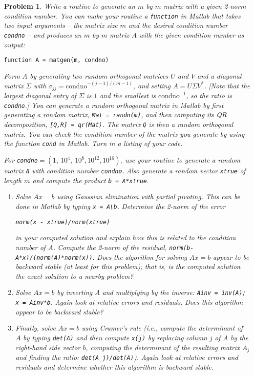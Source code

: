 \documentclass[12pt]{report}
\newtheorem{problem}{Problem}
\begin{document}
\begin{problem}
    Write a routine to generate an $m$ by $m$ matrix with a given 2-norm condition
number.  You can make your routine a \verb+function+ in Matlab that takes
two input arguments -- the matrix size $m$ and the desired condition number
\verb+condno+ -- and produces an $m$ by $m$ matrix $A$ with the given condition
number as output:

\begin{verbatim}
function A = matgen(m, condno)
\end{verbatim}

Form $A$ by generating two random orthogonal matrices $U$ and $V$ and a
diagonal matrix $\Sigma$ with $\sigma_{jj} = \mbox{condno}^{-(j-1)/(m-1)}$,
and setting $A = U \Sigma V^{*}$.  [Note that the largest diagonal entry
of $\Sigma$ is $1$ and the smallest is $\mbox{condno}^{-1}$, so the ratio is
\verb+condno+.]  You can generate a random orthogonal matrix in Matlab by
first generating a random matrix, \verb+Mat = randn(m)+, and then computing
its QR decomposition, \verb+[Q,R] = qr(Mat)+.  The matrix \verb+Q+ is then
a random orthogonal matrix.  You can check the condition number of the
matrix you generate by using the function \verb+cond+ in Matlab.  Turn in
a listing of your code.

For \verb+condno+$= (1,~10^4 ,~10^8 , 10^{12} , 10^{16})$, use your routine
to generate a random matrix \verb+A+ with condition number \verb+condno+.
Also generate a random vector \verb+xtrue+ of length $m$ and compute
the product \verb+b = A*xtrue+.

\begin{enumerate}
\item
Solve $Ax=b$ using Gaussian elimination with partial pivoting.  This
can be done in Matlab by typing \verb+x = A\b+.  Determine the 2-norm
of the error

\verb+norm(x - xtrue)/norm(xtrue)+

in your computed solution
and explain how this is related to the condition number of $A$.  Compute
the 2-norm of the residual, \verb+norm(b-A*x)/(norm(A)*norm(x))+.  Does
the algorithm for solving $Ax=b$ appear to be {\em backward stable} (at least
for this problem);
that is, is the computed solution the exact solution to a nearby problem?
\item
Solve $Ax=b$ by inverting $A$ and multiplying by the inverse:
\verb+Ainv = inv(A); x = Ainv*b+.  Again look at relative errors and
residuals.  Does this algorithm appear to be backward stable?
\item
Finally, solve $Ax=b$ using Cramer's rule (i.e., compute the determinant
of $A$ by typing \verb+det(A)+ and then compute \verb+x(j)+ by replacing
column $j$ of $A$ by the right-hand side vector $b$, computing the determinant
of the resulting matrix $A_j$ and finding the ratio:  \verb+det(A_j)/det(A)+).
Again look at relative errors and residuals and determine whether this
algorithm is backward stable.
\end{enumerate}


\end{problem}
\end{document}
